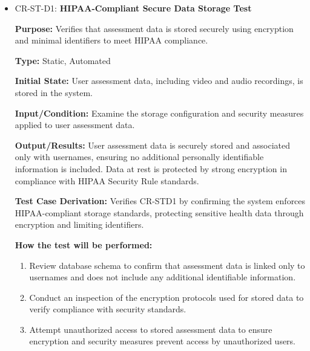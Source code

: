 \documentclass[12pt, titlepage]{article}
\begin{document}
\begin{itemize}

  \item CR-ST-D1: \textbf{HIPAA-Compliant Secure Data Storage Test}
  \begin{mdframed}[linewidth=0.5mm]
      \textbf{Purpose:} Verifies that assessment data is stored securely using encryption and minimal identifiers to meet HIPAA compliance. \par
      \textbf{Type:} Static, Automated \par
      \textbf{Initial State:} User assessment data, including video and audio recordings, is stored in the system. \par
      \textbf{Input/Condition:} Examine the storage configuration and security measures applied to user assessment data. \par
      \textbf{Output/Results:} User assessment data is securely stored and associated only with usernames, ensuring no additional personally identifiable information is included. Data at rest is protected by strong encryption in compliance with HIPAA Security Rule standards. \par
      \textbf{Test Case Derivation:} Verifies CR-STD1 by confirming the system enforces HIPAA-compliant storage standards, protecting sensitive health data through encryption and limiting identifiers. \par
      \textbf{How the test will be performed:}
      \begin{enumerate}[noitemsep]
        \item Review database schema to confirm that assessment data is linked only to usernames and does not include any additional identifiable information.
        \item Conduct an inspection of the encryption protocols used for stored data to verify compliance with security standards.
        \item Attempt unauthorized access to stored assessment data to ensure encryption and security measures prevent access by unauthorized users.
      \end{enumerate}
  \end{mdframed}
\end{itemize}
\end{document}
